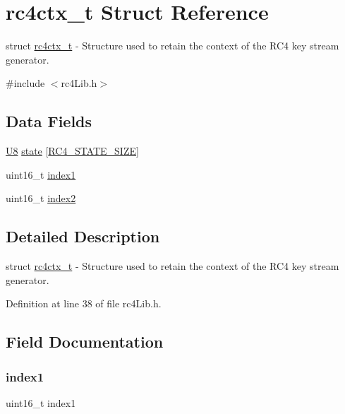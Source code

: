 \hypertarget{structrc4ctx__t}{}\section{rc4ctx\+\_\+t Struct Reference}
\label{structrc4ctx__t}


struct \hyperlink{structrc4ctx__t}{rc4ctx\+\_\+t} -\/ Structure used to retain the context of the R\+C4 key stream generator.  




{\ttfamily \#include $<$rc4\+Lib.\+h$>$}

\subsection*{Data Fields}
\begin{DoxyCompactItemize}
\item 
\hyperlink{rc4_lib_8h_a3cb25ca6f51f003950f9625ff05536fc}{U8} \hyperlink{structrc4ctx__t_ae94ca6cdd84cf2335fa9cf7680e9154b}{state} \mbox{[}\hyperlink{rc4_lib_8h_a50a27b8e7008b8ae28f34a5e082905ef}{R\+C4\+\_\+\+S\+T\+A\+T\+E\+\_\+\+S\+I\+ZE}\mbox{]}
\item 
uint16\+\_\+t \hyperlink{structrc4ctx__t_aa75f446f1da3d9e49c9479a4bece1468}{index1}
\item 
uint16\+\_\+t \hyperlink{structrc4ctx__t_ae5fd30b17cbf40407158aa026b0caaf7}{index2}
\end{DoxyCompactItemize}


\subsection{Detailed Description}
struct \hyperlink{structrc4ctx__t}{rc4ctx\+\_\+t} -\/ Structure used to retain the context of the R\+C4 key stream generator. 

Definition at line 38 of file rc4\+Lib.\+h.



\subsection{Field Documentation}
\mbox{\label{structrc4ctx__t_aa75f446f1da3d9e49c9479a4bece1468}} 
\subsubsection{\texorpdfstring{index1}{index1}}
{\footnotesize\ttfamily uint16\+\_\+t index1}



